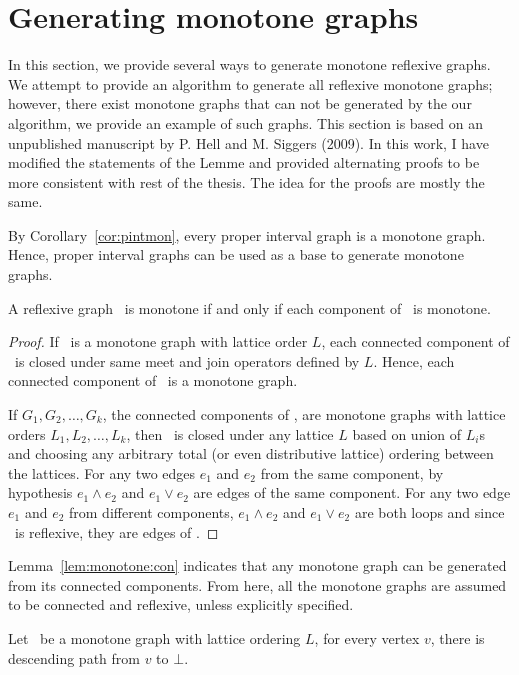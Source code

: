 \section{Generating monotone graphs}
In this section, we provide several ways to generate monotone reflexive graphs.
We attempt to provide an algorithm to generate all reflexive monotone graphs;
however, there exist monotone graphs that can not be generated by the our algorithm,
we provide an example of such graphs. This section is based on an unpublished
manuscript by P. Hell and M. Siggers (2009)\@. In this work, I have modified the
statements of the Lemme and provided alternating proofs to be more consistent with
rest of the thesis. The idea for the proofs are mostly the same.

By Corollary~\ref{cor:pintmon}, every proper interval graph is a monotone graph.
Hence, proper interval graphs can be used as a base to generate monotone graphs.

\begin{lemma} \label{lem:monotone:con}
A reflexive graph \mG\ is monotone if and only if each component of \mG\ is monotone.
\end{lemma}

\begin{proof}
If \mG\ is a monotone graph with lattice order \(L\), each connected component of \mG\ is
closed under same meet and join operators defined by \(L\)\@. Hence, each connected component of 
\mG\ is a monotone graph.

If \(G_1,G_2,\dotsc,G_k\), the connected components of \mG, are
monotone graphs with lattice orders \(L_1,L_2,\dotsc,L_k\),
then \mG\ is closed under any lattice \(L\) based on union of \(L_i\)s
and choosing any arbitrary total (or even distributive lattice) ordering between the
lattices. For any two edges \(e_1\) and \(e_2\) from the same component,
by hypothesis \(e_1\wedge e_2\) and \(e_1\vee e_2\) are
edges of the same component.
For any two edge \(e_1\) and \(e_2\) from different components,
\(e_1\wedge e_2\) and \(e_1\vee e_2\) are both loops and since \mG\ is reflexive,
they are edges of \mG\@.
\end{proof}

Lemma~\ref{lem:monotone:con} indicates that any monotone graph can be generated
from its connected components. From here, all the monotone graphs are
assumed to be connected and reflexive, unless explicitly specified.

\begin{lemma}
Let \mG\ be a monotone graph with lattice ordering \(L\),
for every vertex \(v\), there is descending path from
\(v\) to \(\bot\)\@.
\end{lemma}

